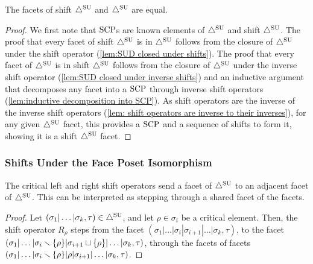 \begin{proposition} \label{prop: shift SUD and SUD are equal}
    The facets of shift $\triangle^{\mathrm{SU}}$ and $\triangle^{\mathrm{SU}}$ are equal.
\end{proposition}
\begin{proof}
    We first note that $\mathrm{SCP}$s are known elements of $\triangle^{\mathrm{SU}}$ and shift $\triangle^{\mathrm{SU}}$.
    The proof that every facet of shift $\triangle^{\mathrm{SU}}$ is in $\triangle^{\mathrm{SU}}$ follows from the closure of $\triangle^{\mathrm{SU}}$ under the shift operator (\cref{lem:SUD closed under shifts}).
    The proof that every facet of $\triangle^{\mathrm{SU}}$ is in shift $\triangle^{\mathrm{SU}}$ follows from the closure of $\triangle^{\mathrm{SU}}$ under the inverse shift operator (\cref{lem:SUD closed under inverse shifts}) and an inductive argument that decomposes any facet into a $\mathrm{SCP}$ through inverse shift operators (\cref{lem:inductive decomposition into SCP}).
    As shift operators are the inverse of the inverse shift operators (\cref{lem: shift operators are inverse to their inverses}), for any given $\triangle^{\mathrm{SU}}$ facet, this provides a $\mathrm{SCP}$ and a sequence of shifts to form it, showing it is a shift $\triangle^{\mathrm{SU}}$ facet.
\end{proof}


\subsubsection{Shifts Under the Face Poset Isomorphism}

\begin{lemma}
The critical left and right shift operators send a facet of $\triangle^{\mathrm{SU}}$ to an adjacent facet of $\triangle^{\mathrm{SU}}$. This can be interpreted as stepping through a shared facet of the facets.
\end{lemma}
\begin{proof}
Let $(\sigma_1|\dots|\sigma_k,\tau) \in \triangle^{\mathrm{SU}}$, and let $\rho \in \sigma_{i}$ be a critical element. Then, the shift operator $R_{\rho}$ steps from the facet $(\sigma_1|\dots|\sigma_i |\sigma_{i+1} |\dots|\sigma_k, \tau)$, to the facet $(\sigma_1|\dots|\sigma_i \smallsetminus \{\rho\}|\sigma_{i+1} \sqcup \{\rho\}|\dots|\sigma_k,\tau)$, through the facets of facets $(\sigma_1|\dots|\sigma_i \smallsetminus \{\rho\}|\rho|\sigma_{i+1}|\dots|\sigma_k, \tau)$.
\end{proof}

